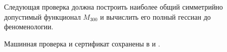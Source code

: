 Следующая проверка должна построить наиболее общий симметрийно допустимый
функционал \(M_{300}\) и вычислить его полный гессиан до феноменологии.

Машинная проверка и сертификат сохранены в
 и
.